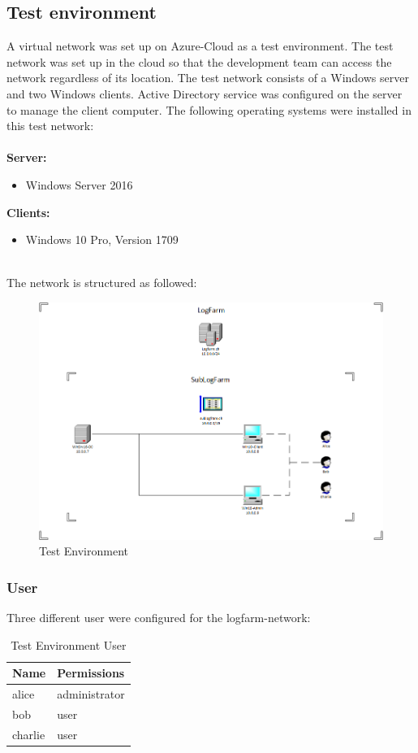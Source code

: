 \subsection{Test environment}
A virtual network was set up on Azure-Cloud as a test environment. The test network was set up in the cloud so that the development team can access the network regardless of its location. The test network consists of a Windows server and two Windows clients. Active Directory service was configured on the server to manage the client computer. The following operating systems were installed in this test network: \\
\\
\textbf{Server:}
\begin{itemize}
    \item Windows Server 2016
\end{itemize}
\textbf{Clients:}
\begin{itemize}
    \item Windows 10 Pro, Version 1709
\end{itemize}
\ \\
The network is structured as followed:\\
\begin{figure}[H]
    \centering
    \includegraphics[width=0.9\linewidth]{assets/testnetwork.png}
    \caption{Test Environment}
\end{figure}

\clearpage

\subsubsection{User}
Three different user were configured for the logfarm-network:
\begin{table}[H]
    \centering
    \begin{tabular}{p{4cm} p{8cm}} \hline
        \textbf{Name} & \textbf{Permissions}  \\ \hline
        alice & administrator  \\ \hline
        bob & user  \\ \hline
        charlie & user  \\ \hline
    \end{tabular}
    \caption{Test Environment User}
\end{table}

